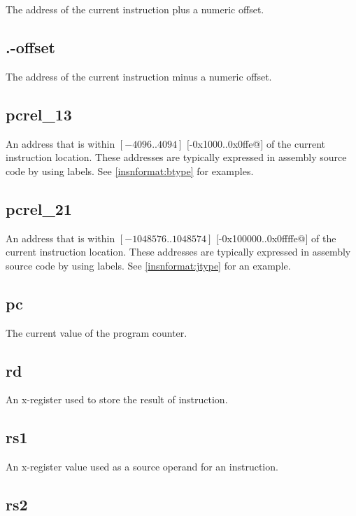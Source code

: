 The address of the current instruction plus a numeric offset.

\subsection{.-offset}

The address of the current instruction minus a numeric offset.

\subsection{pcrel\_13}
\label{pcrel.13}

An address that is within $[-4096..4094]$ $[$\verb@-0x1000..0x0ffe@$]$ of the current instruction location.
These addresses are typically expressed in assembly source code by using labels.
See \autoref{insnformat:btype} for examples.

\subsection{pcrel\_21}
\label{pcrel.21}

An address that is within $[-1048576..1048574]$ $[$\verb@-0x100000..0x0ffffe@$]$ of the current instruction
location.
These addresses are typically expressed in assembly source code by using labels.
See \autoref{insnformat:jtype} for an example.

\subsection{pc}

The current value of the program counter.

\subsection{rd}

An x-register used to store the result of instruction.

\subsection{rs1}

An x-register value used as a source operand for an instruction.

\subsection{rs2}

